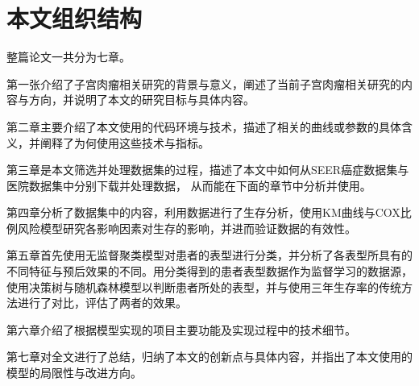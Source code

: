 \section{本文组织结构}

整篇论文一共分为七章。

第一张介绍了子宫肉瘤相关研究的背景与意义，阐述了当前子宫肉瘤相关研究的内容与方向，并说明了本文的研究目标与具体内容。

第二章主要介绍了本文使用的代码环境与技术，描述了相关的曲线或参数的具体含义，并阐释了为何使用这些技术与指标。

第三章是本文筛选并处理数据集的过程，描述了本文中如何从SEER癌症数据集与医院数据集中分别下载并处理数据，
从而能在下面的章节中分析并使用。

第四章分析了数据集中的内容，利用数据进行了生存分析，使用KM曲线与COX比例风险模型研究各影响因素对生存的影响，并进而验证数据的有效性。

第五章首先使用无监督聚类模型对患者的表型进行分类，并分析了各表型所具有的不同特征与预后效果的不同。用分类得到的患者表型数据作为监督学习的数据源，使用决策树与随机森林模型以判断患者所处的表型，并与使用三年生存率的传统方法进行了对比，评估了两者的效果。

第六章介绍了根据模型实现的项目主要功能及实现过程中的技术细节。

第七章对全文进行了总结，归纳了本文的创新点与具体内容，并指出了本文使用的模型的局限性与改进方向。

